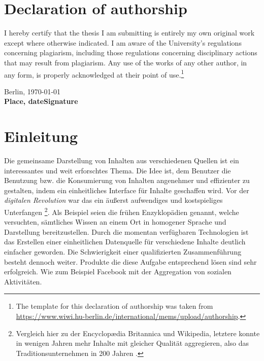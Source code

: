 \documentclass[12pt,twoside]{book}
\newcommand\blankpage{%
    \null
    \thispagestyle{empty}%
    \addtocounter{page}{-1}%
    \newpage}
\begin{document}


\chapter*{Declaration of authorship}

I hereby certify that the thesis I am submitting is entirely my own original work except where otherwise indicated. I am aware of the University's regulations concerning plagiarism, including those regulations concerning disciplinary actions that may result from plagiarism. Any use of the works of any other author, in any form, is properly acknowledged at their point of use.\footnote{The template for this declaration of authorship was taken from \url{https://www.wiwi.hu-berlin.de/international/mems/upload/authorship}.}

\vspace{2cm}

Berlin, \today\\
\textbf{Place, date}\hfill\textbf{Signature}

\tableofcontents
\newpage


\chapter{Einleitung}

Die gemeinsame Darstellung von Inhalten aus verschiedenen Quellen ist ein interessantes und weit erforschtes Thema. Die Idee ist, dem Benutzer die Benutzung bzw. die Konsumierung von Inhalten angenehmer und effizienter zu gestalten, indem ein einheitliches Interface für Inhalte geschaffen wird. Vor der \textit{digitalen Revolution} war das ein äußerst aufwendiges und kostspieliges Unterfangen \footnote{Vergleich hier zu der Encyclopædia Britannica
und Wikipedia, letztere konnte in wenigen Jahren mehr Inhalte mit gleicher Qualität aggregieren, also das Traditionsunternehmen in 200 Jahren \cite{giles2005internet}.}. Als Beispiel seien die frühen Enzyklopädien genannt, welche versuchten, sämtliches Wissen an einem Ort in homogener Sprache und Darstellung bereitzustellen. Durch die momentan verfügbaren Technologien ist das Erstellen einer einheitlichen Datenquelle für verschiedene Inhalte deutlich einfacher geworden. Die Schwierigkeit einer qualifizierten Zusammenführung besteht dennoch weiter. Produkte die diese Aufgabe entsprechend lösen sind sehr erfolgreich. Wie zum Beispiel Facebook mit der Aggregation von sozialen Aktivitäten.
\end{document}
